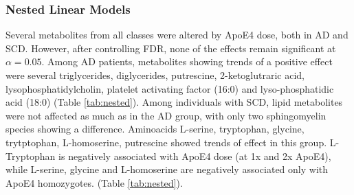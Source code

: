 \documentclass{amsart}
\begin{document}
\subsubsection{Nested Linear Models}
Several metabolites from all classes were altered by ApoE4 dose, both in AD and SCD. However, after controlling FDR, none of the effects remain significant at $\alpha=0.05$. Among AD patients, metabolites showing trends of a positive effect were several triglycerides, diglycerides, putrescine, 2-ketoglutraric acid, lysophosphatidylcholin, platelet activating factor (16:0) and lyso-phosphatidic acid (18:0) (Table \ref{tab:nested}). Among individuals with SCD, lipid metabolites were not affected as much as in the AD group, with only two sphingomyelin species showing a difference. Aminoacids L-serine, tryptophan, glycine, trytptophan, L-homoserine, putrescine showed trends of effect in this group. L-Tryptophan is negatively associated with ApoE4 dose (at 1x and 2x ApoE4), while L-serine, glycine and L-homoserine are negatively associated only with ApoE4 homozygotes. (Table \ref{tab:nested}). 
\end{document}

